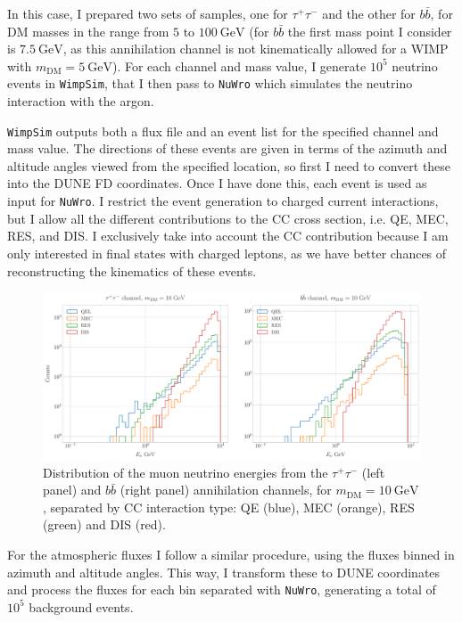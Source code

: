 In this case, I prepared two sets of samples, one for $\tau^{+} \tau^{-}$ and the other for $b\bar{b}$, for DM masses in the range from $5$ to $100 \ \mathrm{GeV}$ (for $b\bar{b}$ the first mass point I consider is $7.5 \ \mathrm{GeV}$, as this annihilation channel is not kinematically allowed for a WIMP with $m_{\mathrm{DM}}=5 \ \mathrm{GeV}$). For each channel and mass value, I generate $10^{5}$ neutrino events in \texttt{WimpSim}, that I then pass to \texttt{NuWro} which simulates the neutrino interaction with the argon.

\texttt{WimpSim} outputs both a flux file and an event list for the specified channel and mass value. The directions of these events are given in terms of the azimuth and altitude angles viewed from the specified location, so first I need to convert these into the DUNE FD coordinates. Once I have done this, each event is used as input for \texttt{NuWro}. I restrict the event generation to charged current interactions, but I allow all the different contributions to the CC cross section, i.e. QE, MEC, RES, and DIS. I exclusively take into account the CC contribution because I am only interested in final states with charged leptons, as we have better chances of reconstructing the kinematics of these events.

\begin{figure}[t]
	\centering
	\includegraphics[width=1\linewidth]{Images/DM_Analysis/solardm_nu_mu_interactions.pdf}
	\caption[Distribution of the muon neutrino energies from the $\tau^{+} \tau^{-}$ and $b\bar{b}$ annihilation channels.]{Distribution of the muon neutrino energies from the $\tau^{+} \tau^{-}$ (left panel) and $b\bar{b}$ (right panel) annihilation channels, for $m_{\mathrm{DM}} = 10 \ \mathrm{GeV}$, separated by CC interaction type: QE (blue), MEC (orange), RES (green) and DIS (red).}
	\label{fig:solardm_nu_mu_interactions}
\end{figure}

For the atmospheric fluxes I follow a similar procedure, using the fluxes binned in azimuth and altitude angles. This way, I transform these to DUNE coordinates and process the fluxes for each bin separated with \texttt{NuWro}, generating a total of $10^{5}$ background events.

